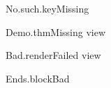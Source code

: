 \begin{leanblock}{No.such.key}{Missing}
\end{leanblock}
\begin{leanblock}[view=prose]{Demo.thm}{Missing view}
\end{leanblock}
\begin{leanblock}[view=math]{Bad.render}{Failed view}
\end{leanblock}
\begin{leanblock}{Ends.block}{Bad}
\end{leanblock}

